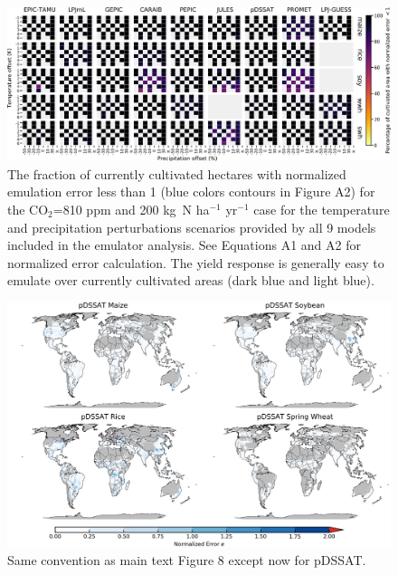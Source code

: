 \documentclass[10pt]{article}
\begin{document}
\begin{figure}[h!]
\centering
\includegraphics[width=15.5cm]{error_grid_810.png}
\caption{The fraction of currently cultivated hectares with normalized emulation error less than 1 (blue colors contours in Figure A2) for the CO$_2$=810 ppm and 200 kg~N ha$^{-1}$ yr$^{-1}$ case for the temperature and precipitation perturbations scenarios provided by all 9 models included in the emulator analysis. See Equations A1 and A2 for normalized error calculation. The yield response is generally easy to emulate over currently cultivated areas (dark blue and light blue).}
\label{fig:error810}
\end{figure}


\begin{figure}[h!]
\centering
\includegraphics[width=15.5cm]{pDSSAT_spatial_error.png}
\caption{Same convention as main text Figure 8 except now for pDSSAT.}
\label{fig:pdssatnorm}
\end{figure}
\end{document}
